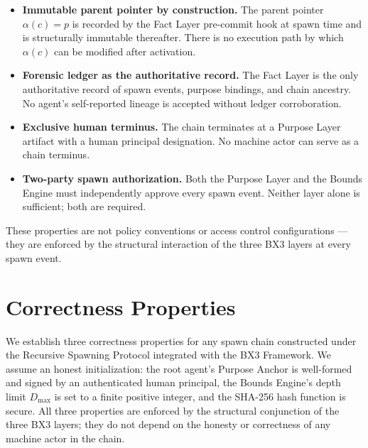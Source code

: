 \begin{itemize}
  \item \textbf{Immutable parent pointer by construction.} The parent pointer $\alpha(c) = p$ is recorded by the Fact Layer pre-commit hook at spawn time and is structurally immutable thereafter. There is no execution path by which $\alpha(c)$ can be modified after activation.
  \item \textbf{Forensic ledger as the authoritative record.} The Fact Layer is the only authoritative record of spawn events, purpose bindings, and chain ancestry. No agent's self-reported lineage is accepted without ledger corroboration.
  \item \textbf{Exclusive human terminus.} The chain terminates at a Purpose Layer artifact with a human principal designation. No machine actor can serve as a chain terminus.
  \item \textbf{Two-party spawn authorization.} Both the Purpose Layer and the Bounds Engine must independently approve every spawn event. Neither layer alone is sufficient; both are required.
\end{itemize}

These properties are not policy conventions or access control configurations — they are enforced by the structural interaction of the three BX3 layers at every spawn event.


\section{Correctness Properties}
\label{sec:correctness-properties}

We establish three correctness properties for any spawn chain constructed under the Recursive Spawning Protocol integrated with the BX3 Framework. We assume an honest initialization: the root agent's Purpose Anchor is well-formed and signed by an authenticated human principal, the Bounds Engine's depth limit $D_{\max}$ is set to a finite positive integer, and the SHA-256 hash function is secure. All three properties are enforced by the structural conjunction of the three BX3 layers; they do not depend on the honesty or correctness of any machine actor in the chain.

